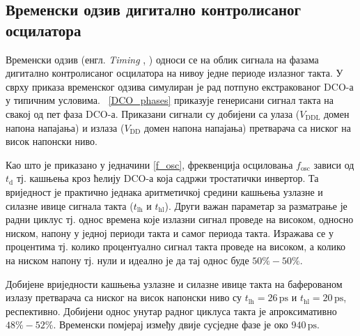 \documentclass[master]{finthesis}
\makeatletter
\newcommand*{\engl}[2][\@empty]{%
    \edef\theacronym{#1}%
    (енгл. \foreignlanguage{english}{\emph{#2}%
    \ifx\theacronym\@empty \else , #1\fi})%
}
\def \DCO  {DCO} %
\makeatother
\begin{document}
\subsection{Временски одзив дигитално контролисаног осцилатора}
Временски одзив \engl{Timing} односи се на облик сигнала на фазама дигитално контролисаног осцилатора на нивоу једне периоде излазног такта. У сврху приказа временског одзива симулиран је рад потпуно екстракованог \DCO-а у типичним условима. \figurename~\ref{DCO_phases} приказује генерисани сигнал такта на свакој од пет фаза \DCO-а. Приказани сигнали су добијени са улаза ($V_\text{DDL}$ домен напона напајања) и излаза ($V_\text{DD}$ домен напона напајања) претварача са ниског на висок напонски ниво.

Као што је приказано у једначини \ref{f_osc}, фреквенција осциловања $f_\text{osc}$ зависи од $t_\text{d}$ тј. кашњења кроз ћелију \DCO-а која садржи тростатички инвертор. Та вриједност је практично једнака аритметичкој средини кашњења узлазне и силазне ивице сигнала такта ($t_\text{lh}$ и $t_\text{hl}$). Други важан параметар за разматрање је радни циклус тј. однос времена које излазни сигнал проведе на високом, односно ниском, напону у једној периоди такта и самог периода такта. Изражава се у процентима тј. колико процентуално сигнал такта проведе на високом, а колико на ниском напону тј. нули и идеално је да тај однос буде $50\%-50\%$. \par
Добијене вриједности кашњења узлазне и силазне ивице такта на баферованом излазу претварача са ниског на висок напонски ниво су $t_\text{lh}=26\,\text{ps}$ и $t_\text{hl}=20\,\text{ps}$, респективно. Добијени однос унутар радног циклуса такта је апроксимативно $48\%-52\%$. Временски помјерај између двије сусједне фазе је око $940\,\text{ps}$.
\end{document}
